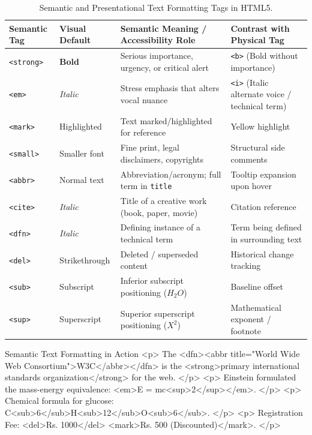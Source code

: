 \begin{table}[htbp]
\centering
\small
\renewcommand{\arraystretch}{1.3}
\begin{tabularx}{\linewidth}{lllX}
\toprule
\textbf{Semantic Tag} & \textbf{Visual Default} & \textbf{Semantic Meaning / Accessibility Role} & \textbf{Contrast with Physical Tag} \\
\midrule
\texttt{<strong>} & \textbf{Bold} & Serious importance, urgency, or critical alert & \texttt{<b>} (Bold without importance) \\
\texttt{<em>} & \textit{Italic} & Stress emphasis that alters vocal nuance & \texttt{<i>} (Italic alternate voice / technical term) \\
\texttt{<mark>} & Highlighted & Text marked/highlighted for reference & Yellow highlight \\
\texttt{<small>} & Smaller font & Fine print, legal disclaimers, copyrights & Structural side comments \\
\texttt{<abbr>} & Normal text & Abbreviation/acronym; full term in \texttt{title} & Tooltip expansion upon hover \\
\texttt{<cite>} & \textit{Italic} & Title of a creative work (book, paper, movie) & Citation reference \\
\texttt{<dfn>} & \textit{Italic} & Defining instance of a technical term & Term being defined in surrounding text \\
\texttt{<del>} & Strikethrough & Deleted / superseded content & Historical change tracking \\
\texttt{<sub>} & Subscript & Inferior subscript positioning ($H_2O$) & Baseline offset \\
\texttt{<sup>} & Superscript & Superior superscript positioning ($X^2$) & Mathematical exponent / footnote \\
\bottomrule
\end{tabularx}
\caption{Semantic and Presentational Text Formatting Tags in HTML5.}
\label{tab:formatting-tags}
\end{table}

\begin{htmlcode}{Semantic Text Formatting in Action}
<p>
    The <dfn><abbr title="World Wide Web Consortium">W3C</abbr></dfn> is the 
    <strong>primary international standards organization</strong> for the web.
</p>
<p>
    Einstein formulated the mass-energy equivalence: <em>E = mc<sup>2</sup></em>.
</p>
<p>
    Chemical formula for glucose: C<sub>6</sub>H<sub>12</sub>O<sub>6</sub>.
</p>
<p>
    Registration Fee: <del>Rs. 1000</del> <mark>Rs. 500 (Discounted)</mark>.
</p>
\end{htmlcode}

